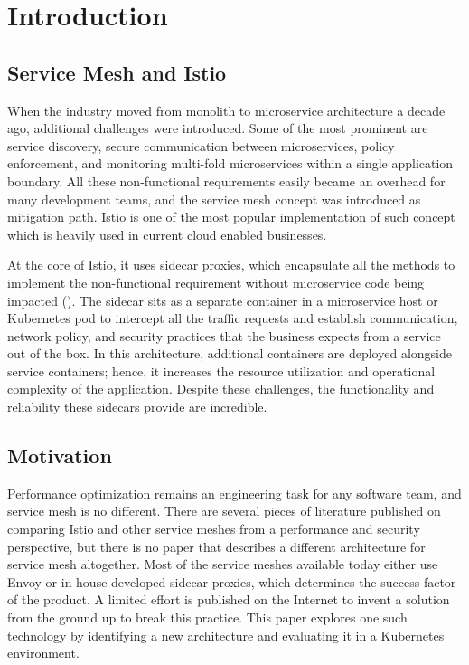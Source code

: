 \section{Introduction}
\subsection{Service Mesh and Istio}
When the industry moved from monolith to microservice architecture a decade ago, additional challenges were introduced. Some of the most prominent are service discovery, secure communication between microservices, policy enforcement, and monitoring multi-fold microservices within a single application boundary. All these non-functional requirements easily became an overhead for many development teams, and the service mesh concept was introduced as mitigation path. Istio is one of the most popular implementation of such concept which is heavily used in current cloud enabled businesses.

At the core of Istio, it uses sidecar proxies, which encapsulate all the methods to implement the non-functional requirement without microservice code being impacted (\cite{techcrunch2022}). The sidecar sits as a separate container in a microservice host or Kubernetes pod to intercept all the traffic requests and establish communication, network policy, and security practices that the business expects from a service out of the box. In this architecture, additional containers are deployed alongside service containers; hence, it increases the resource utilization and operational complexity of the application. Despite these challenges, the functionality and reliability these sidecars provide are incredible.

\subsection{Motivation}
Performance optimization remains an engineering task for any software team, and service mesh is no different. There are several pieces of literature published on comparing Istio and other service meshes from a performance and security perspective, but there is no paper that describes a different architecture for service mesh altogether. Most of the service meshes available today either use Envoy or in-house-developed sidecar proxies, which determines the success factor of the product. A limited effort is published on the Internet to invent a solution from the ground up to break this practice. This paper explores one such technology by identifying a new architecture and evaluating it in a Kubernetes environment.

